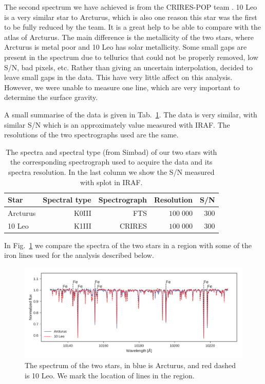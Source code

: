 \documentclass{aa}
\begin{document}
The second spectrum we have achieved is from the CRIRES-POP team
\citep{Nicholls2016}. 10 Leo is a very similar star to Arcturus, which is also
one reason this star was the first to be fully reduced by the team. It is a
great help to be able to compare with the atlas of Arcturus. The main difference
is the metallicity of the two stars, where Arcturus is metal poor and 10 Leo has
solar metallicity.  Some small gaps are present in the spectrum due to tellurics
that could not be properly removed, low S/N, bad pixels, etc. Rather than giving
an uncertain interpolation, \citet{Nicholls2016} decided to leave small gaps in
the data. This have very little affect on this analysis. However, we were unable
to measure one  line, which are very important to determine the
surface gravity.

A small summarise of the data is given in Tab.~\ref{tab:data}. The data is very
similar, with similar S/N which is an approximately value measured with IRAF.
The resolutions of the two spectrographs used are the same.


\begin{table}[htb!]
    \caption{The spectra and spectral type (from Simbad) of our two stars with
             the corresponding spectrograph used to acquire the data and its
             spectra resolution. In the last column we show the S/N measured
             with splot in IRAF.}
    \label{tab:data}
    \centering
    \begin{tabular}{lrrrr}
      \hline\hline
        Star      & Spectral type & Spectrograph  & Resolution   &  S/N  \\
      \hline
        Arcturus  &      K0III    & FTS           &  $100\;000$  &  300  \\
        10 Leo    &      K1III    & CRIRES        &  $100\;000$  &  300
    \end{tabular}
\end{table}


In Fig.~\ref{fig:both} we compare the spectra of the two stars in a region with
some of the iron lines used for the analysis described below.

\begin{figure}[tpb]
    \centering
    \includegraphics[width=1.0\linewidth]{figures/bothspectra.pdf}
    \caption{The spectrum of the two stars, in blue is Arcturus, and red dashed
             is 10 Leo. We mark the location of  lines in the region.}
    \label{fig:both}
\end{figure}
\end{document}
